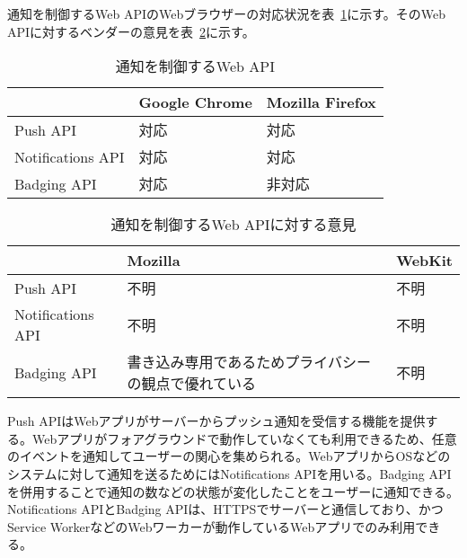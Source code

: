 通知を制御するWeb APIのWebブラウザーの対応状況を表~\ref{table:通知を制御するWeb API}に示す。そのWeb APIに対するベンダーの意見を表~\ref{table:通知を制御するWeb APIに対する意見}に示す。
\begin{table}
  \caption{通知を制御するWeb API}
  \label{table:通知を制御するWeb API}
  \centering
  \begin{tabular}{|p{13em}|p{8em}|p{8em}|}
    \hline
    & Google Chrome & Mozilla Firefox \\ \hline
    Push API & \cellcolor{green!25}対応 & \cellcolor{green!25}対応 \\ \hline
    Notifications API & \cellcolor{green!25}対応 & \cellcolor{green!25}対応 \\ \hline
    Badging API & \cellcolor{green!25}対応 & \cellcolor{red!25}非対応 \\ \hline
  \end{tabular}
\end{table}
\begin{table}
  \caption{通知を制御するWeb APIに対する意見}
  \label{table:通知を制御するWeb APIに対する意見}
    \centering
    \begin{tabular}{|p{13em}|p{13em}|p{13em}|}
        \hline
        & Mozilla & WebKit \\ \hline
        Push API & 不明 & 不明 \\ \hline
        Notifications API & 不明 & 不明 \\ \hline
        Badging API & \cellcolor{green!25}書き込み専用であるためプライバシーの観点で優れている~\cite{MozillaBadgingAPI} & 不明 \\ \hline
    \end{tabular}
\end{table}
Push APIはWebアプリがサーバーからプッシュ通知を受信する機能を提供する。Webアプリがフォアグラウンドで動作していなくても利用できるため、任意のイベントを通知してユーザーの関心を集められる。WebアプリからOSなどのシステムに対して通知を送るためにはNotifications APIを用いる。Badging APIを併用することで通知の数などの状態が変化したことをユーザーに通知できる。Notifications APIとBadging APIは、HTTPSでサーバーと通信しており、かつService WorkerなどのWebワーカーが動作しているWebアプリでのみ利用できる。